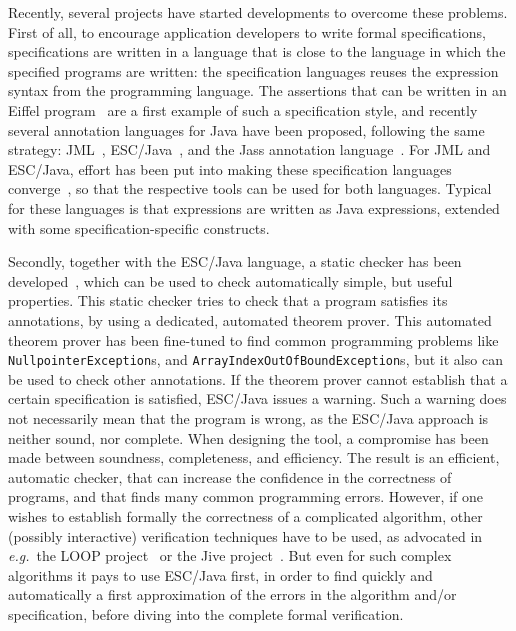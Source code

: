 \documentclass[a4paper]{llncs}
\begin{document}
Recently, several projects have started developments to overcome these
problems. First of all, to encourage application developers to write
formal specifications, specifications are written in a language that
is close to the language in which the specified programs are written:
the specification languages reuses the expression syntax from the
programming language.  The assertions that can be written in an Eiffel
program~\cite{Meyer97} are a first example of such a specification
style, and recently several annotation languages for Java have been
proposed, following the same strategy: JML~\cite{LeavensBR99},
ESC/Java~\cite{ESCJavaUrl}, and the Jass annotation
language~\cite{JassUrl}. For JML and ESC/Java, effort has been put
into making these specification languages converge~\cite{EscJmlDiff},
so that the respective tools can be used for both languages. Typical
for these languages is that expressions are written as Java
expressions, extended with some specification-specific constructs.

Secondly, together with the ESC/Java language, a static checker has
been developed~\cite{ESCJavaUrl}, which can be used to check
automatically simple, but useful properties. This static checker tries
to check that a program satisfies its annotations, by using a
dedicated, automated theorem prover. This automated theorem prover has
been fine-tuned to find common programming problems like
\texttt{Null\-pointer\-Exception}s, and
\texttt{Array\-Index\-Out\-Of\-Bound\-Exception}s, but it also can be
used to check other annotations. If the theorem prover cannot
establish that a certain specification is satisfied, ESC/Java issues a
warning. Such a warning does not necessarily mean that the program is
wrong, as the ESC/Java approach is neither sound, nor complete. When
designing the tool, a compromise has been made between soundness,
completeness, and efficiency. The result is an efficient, automatic
checker, that can increase the confidence in the correctness of
programs, and that finds many common programming errors. However, if
one wishes to establish formally the correctness of a complicated
algorithm, other (possibly interactive) verification techniques have
to be used, as advocated in
\emph{e.g.}~the LOOP project~\cite{LOOPUrl} or the Jive
project~\cite{MeyerP00}. But even for such complex algorithms it pays
to use ESC/Java first, in order to find quickly and automatically a
first approximation of the errors in the algorithm and/or
specification, before diving into the complete formal verification.
\end{document}
